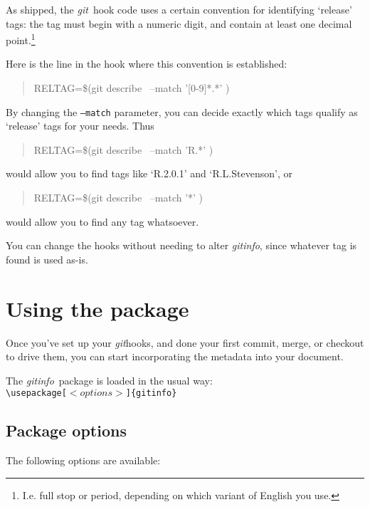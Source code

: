 \documentclass[a4paper,12pt,twoside,openany]{memoir}
\newcommand{\sfit}[1]{\textit{#1}}
\newcommand{\git}{\sfit{git}}
\newcommand{\tpname}{\sfit{gitinfo}}
\begin{document}
As shipped, the \git\ hook code uses a certain convention
for identifying `release' tags:
the tag must begin with a numeric digit, and contain at least one decimal
point.\footnote{I.e. full stop or period, depending on which variant of English you use.}

Here is the line in the hook where this convention is established:

\begin{quotation}
{\ttfamily
RELTAG=\$(git describe \textellipsis\ --match '[0-9]*.*' \textellipsis)
}
\end{quotation}

By changing the \texttt{--match} parameter, you can decide exactly which tags
qualify as `release' tags for your needs. Thus

\begin{quotation}
{\ttfamily
RELTAG=\$(git describe \textellipsis\ --match 'R.*' \textellipsis)
}
\end{quotation}
would allow you to find tags like `R.2.0.1' and `R.L.Stevenson',
or

\begin{quotation}
{\ttfamily
RELTAG=\$(git describe \textellipsis\ --match '*' \textellipsis)
}
\end{quotation}
would allow you to find any tag whatsoever.

You can change the hooks without needing to alter \tpname,
since whatever tag is found is used as-is.

\chapter{Using the package}
\label{ch:using}
Once you've set up your \git hooks, and done your first commit,
merge, or checkout to drive them,
you can start incorporating the metadata into your document.

The \tpname\ package is loaded in the usual way:\\[0.5\baselineskip]
\texttt{\textbackslash usepackage[$<options>$]\{gitinfo\}}

\section{Package options}

The following options are available:\\[0.5\baselineskip]
\end{document}
